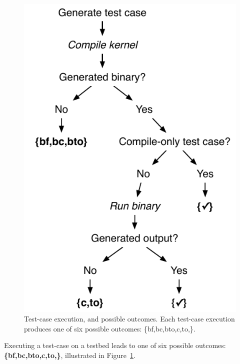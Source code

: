 \begin{figure}
	\centering %
	\includegraphics[width=.62\columnwidth]{img/test_process}%
	\caption{%
		Test-case execution, and possible outcomes. Each test-case execution produces one of six possible outcomes: \{bf,bc,bto,c,to,\cmark\}.%
	}%
	\label{fig:test-process} %
\end{figure}


Executing a test-case on a testbed leads to one of six possible outcomes: \textbf{\{bf,bc,bto,c,to,\cmark\}}, illustrated in Figure~\ref{fig:test-process}.

